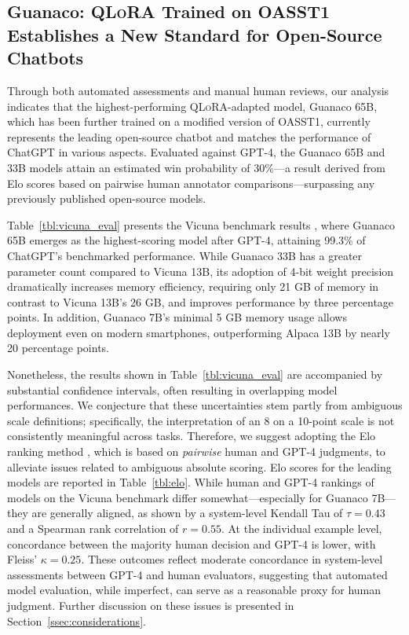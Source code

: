 \subsection{\textbf{Guanaco}: \textsc{QLoRA} Trained on OASST1 Establishes a New Standard for Open-Source Chatbots}

Through both automated assessments and manual human reviews, our analysis indicates that the highest-performing \textsc{QLoRA}-adapted model, {Guanaco} 65B, which has been further trained on a modified version of OASST1, currently represents the leading open-source chatbot and matches the performance of ChatGPT in various aspects. Evaluated against GPT-4, the {Guanaco} 65B and 33B models attain an estimated win probability of 30\%—a result derived from Elo scores based on pairwise human annotator comparisons—surpassing any previously published open-source models.

Table~\ref{tbl:vicuna_eval} presents the Vicuna benchmark results \cite{vicuna2023}, where {Guanaco} 65B emerges as the highest-scoring model after GPT-4, attaining 99.3\% of ChatGPT’s benchmarked performance. While {Guanaco} 33B has a greater parameter count compared to Vicuna 13B, its adoption of 4-bit weight precision dramatically increases memory efficiency, requiring only 21 GB of memory in contrast to Vicuna 13B’s 26 GB, and improves performance by three percentage points. In addition, {Guanaco} 7B’s minimal 5 GB memory usage allows deployment even on modern smartphones, outperforming Alpaca 13B by nearly 20 percentage points.

Nonetheless, the results shown in Table~\ref{tbl:vicuna_eval} are accompanied by substantial confidence intervals, often resulting in overlapping model performances. We conjecture that these uncertainties stem partly from ambiguous scale definitions; specifically, the interpretation of an 8 on a 10-point scale is not consistently meaningful across tasks. Therefore, we suggest adopting the Elo ranking method \citep{elo1967proposed}, which is based on \textit{pairwise} human and GPT-4 judgments, to alleviate issues related to ambiguous absolute scoring. Elo scores for the leading models are reported in Table~\ref{tbl:elo}. While human and GPT-4 rankings of models on the Vicuna benchmark differ somewhat—especially for Guanaco 7B—they are generally aligned, as shown by a system-level Kendall Tau of $\tau=0.43$ and a Spearman rank correlation of $r=0.55$. At the individual example level, concordance between the majority human decision and GPT-4 is lower, with Fleiss’ $\kappa=0.25$. These outcomes reflect moderate concordance in system-level assessments between GPT-4 and human evaluators, suggesting that automated model evaluation, while imperfect, can serve as a reasonable proxy for human judgment. Further discussion on these issues is presented in Section~\ref{ssec:considerations}.

